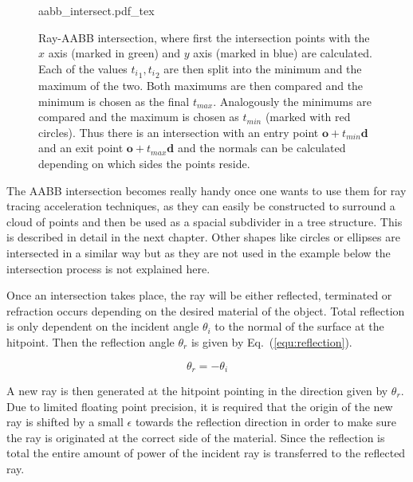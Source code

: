 \documentclass[a4paper,10pt]{article}
\renewcommand{\vec}[1]{\mathbf{#1}}
\newcommand{\equref}[1]{Eq.~(\ref{#1})}
\begin{document}
    \begin{center}
        \begin{figure}
            \centering    
            \def\svgwidth{0.6\textwidth}
            {aabb_intersect.pdf_tex}
            \caption{
                Ray-AABB intersection, where first the intersection points with
                the $x$ axis (marked in green) and $y$ axis (marked in blue) are
                calculated.
                Each of the values ${t_i}_1, {t_i}_2$ are then split into the minimum
                and the maximum of the two.
                Both maximums are then compared and the minimum is chosen as the final 
                $t_{max}$.
                Analogously the minimums are compared and the maximum is chosen as
                $t_{min}$ (marked with red circles).
                Thus there is an intersection with an entry point 
                $\vec{o} + t_{min}\vec{d}$ and an exit point 
                $\vec{o} + t_{max}\vec{d}$ and the normals can be calculated depending
                on which sides the points reside.
            }
            \label{fig:aabb_intersect}
        \end{figure}
    \end{center}

    The AABB intersection becomes really handy once one wants to use them
    for ray tracing acceleration techniques, as they can easily be constructed
    to surround a cloud of points and then be used as a spacial subdivider
    in a tree structure.
    This is described in detail in the next chapter.
    Other shapes like circles or ellipses are intersected in a similar way
    but as they are not used in the example below the intersection process
    is not explained here.

    Once an intersection takes place, the ray will be either reflected, terminated
    or refraction occurs depending on the desired material of the object.
    Total reflection is only dependent on the incident angle $\theta_i$ 
    to the normal of the surface at the hitpoint.
    Then the reflection angle $\theta_r$ is given by \equref{equ:reflection}.

    \begin{equation}
        \label{equ:reflection}
        \theta_r = -\theta_i
    \end{equation}

    A new ray is then generated at the hitpoint pointing in the direction
    given by $\theta_r$.
    Due to limited floating point precision, it is required that the origin
    of the new ray is shifted by a small $\epsilon$ towards the 
    reflection direction in order to make sure the ray is originated at the
    correct side of the material.
    Since the reflection is total the entire amount of power of the incident
    ray is transferred to the reflected ray.
\end{document}
